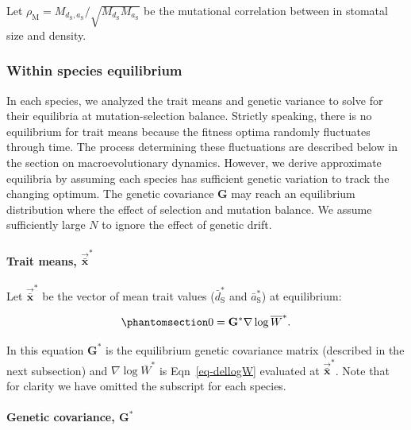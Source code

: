 \documentclass[
  letterpaper,
  DIV=11,
  numbers=noendperiod]{scrartcl}
\let\oldparagraph\paragraph
\renewcommand{\paragraph}[1]{\oldparagraph{#1}\mbox{}}
\begin{document}
Let
\(\rho_\mathrm{M} = M_{d_\mathrm{S},a_\mathrm{S}} / \sqrt{M_{d_\mathrm{S}} M_{a_\mathrm{S}}}\)
be the mutational correlation between in stomatal size and density.

\subsubsection{Within species
equilibrium}\label{within-species-equilibrium}

In each species, we analyzed the trait means and genetic variance to
solve for their equilibria at mutation-selection balance. Strictly
speaking, there is no equilibrium for trait means because the fitness
optima randomly fluctuates through time. The process determining these
fluctuations are described below in the section on macroevolutionary
dynamics. However, we derive approximate equilibria by assuming each
species has sufficient genetic variation to track the changing optimum.
The genetic covariance \(\mathbf{G}\) may reach an equilibrium
distribution where the effect of selection and mutation balance. We
assume sufficiently large \(N\) to ignore the effect of genetic drift.

\paragraph{\texorpdfstring{Trait means,
\(\vec{\bar{\mathbf{x}}}^*\)}{Trait means, \textbackslash vec\{\textbackslash bar\{\textbackslash mathbf\{x\}\}\}\^{}*}}\label{trait-means-vecbarmathbfx}

Let \(\vec{\bar{\mathbf{x}}}^*\) be the vector of mean trait values
(\(\bar{d}^*_\mathrm{S}\) and \(\bar{a}^*_\mathrm{S}\)) at equilibrium:

\begin{equation}\phantomsection\label{eq-dxbarstar}{0 = \mathbf{G}^* \nabla \log \overline{W}^*.}\end{equation}

In this equation \(\mathbf{G}^*\) is the equilibrium genetic covariance
matrix (described in the next subsection) and
\(\nabla \log \overline{W}^*\) is Eqn~\ref{eq-dellogW} evaluated at
\(\vec{\bar{\mathbf{x}}}^*\). Note that for clarity we have omitted the
subscript for each species.

\paragraph{\texorpdfstring{Genetic covariance,
\(\mathbf{G}^*\)}{Genetic covariance, \textbackslash mathbf\{G\}\^{}*}}\label{genetic-covariance-mathbfg}
\end{document}
